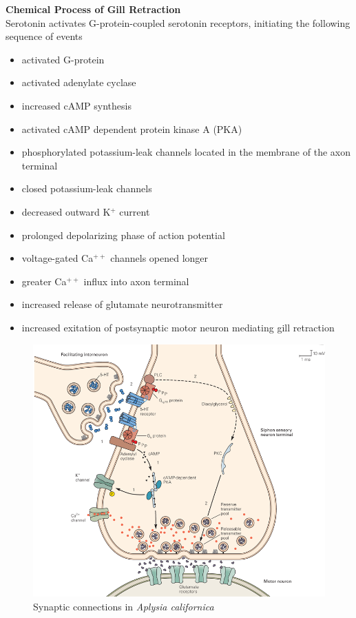 \documentclass{article}
\begin{document}
\noindent \textbf{Chemical Process of Gill Retraction} \\
Serotonin activates G-protein-coupled serotonin receptors, initiating the following sequence of events
\begin{itemize}
    \item activated G-protein
    \item activated adenylate cyclase 
    \item increased cAMP synthesis
    \item activated cAMP dependent protein kinase A (PKA) 
    \item phosphorylated potassium-leak channels located in the membrane of the axon terminal 
    \item closed potassium-leak channels 
    \item decreased outward K$^+$ current
    \item prolonged depolarizing phase of action potential
    \item voltage-gated Ca$^{++}$ channels opened longer 
    \item greater Ca$^{++}$ influx into axon terminal 
    \item increased release of glutamate neurotransmitter 
    \item increased exitation of postsynaptic motor neuron mediating gill retraction
\end{itemize}

\begin{figure}[htp]
\centering
\includegraphics[width=\textwidth]{images/seaharesynapse.png}
\caption{Synaptic connections in \textit{Aplysia californica}}
\label{fig: Sea Slug}
\end{figure}
\end{document}
